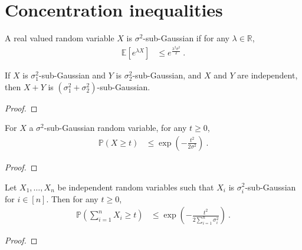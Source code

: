 \chapter{Concentration inequalities}

\begin{definition}\label{def:subGaussian}
  \mathlibok
A real valued random variable $X$ is $\sigma^2$-sub-Gaussian if for any $\lambda \in \mathbb{R}$,
\begin{align*}
  \mathbb{E}\left[e^{\lambda X}\right]
  &\le e^{\frac{\lambda^2 \sigma^2}{2}}
  \: .
\end{align*}
\end{definition}


\begin{lemma}\label{lem:subGaussian_add_of_indepFun}
  \mathlibok
If $X$ is $\sigma_1^2$-sub-Gaussian and $Y$ is $\sigma_2^2$-sub-Gaussian, and $X$ and $Y$ are independent, then $X + Y$ is $(\sigma_1^2 + \sigma_2^2)$-sub-Gaussian.
\end{lemma}

\begin{proof}\leanok

\end{proof}


\begin{lemma}\label{lem:hoeffding_one}
  \mathlibok
For $X$ a $\sigma^2$-sub-Gaussian random variable, for any $t \ge 0$,
\begin{align*}
  \mathbb{P}(X \ge t)
  &\le \exp\left(- \frac{t^2}{2 \sigma^2}\right)
  \: .
\end{align*}
\end{lemma}

\begin{proof}\leanok

\end{proof}


\begin{theorem}\label{thm:hoeffding}
  \mathlibok
Let $X_1, \ldots, X_n$ be independent random variables such that $X_i$ is $\sigma_i^2$-sub-Gaussian for $i \in [n]$.
Then for any $t \ge 0$,
\begin{align*}
  \mathbb{P}\left(\sum_{i=1}^n X_i \ge t\right)
  &\le \exp\left(- \frac{t^2}{2 \sum_{i=1}^n \sigma_i^2}\right)
  \: .
\end{align*}
\end{theorem}

\begin{proof}\leanok

\end{proof}
